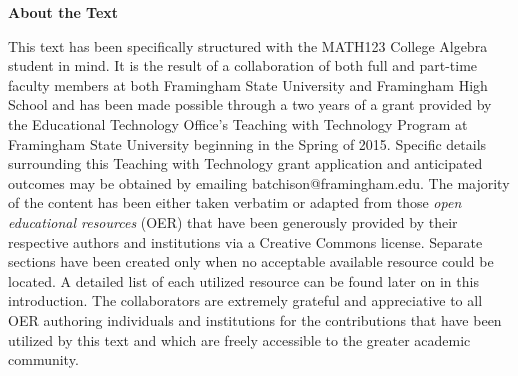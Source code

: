 \begin{center}\textbf{About the Text} \end{center}\par \indent This text has been specifically structured with the MATH123 College Algebra student in mind.  It is the result of a collaboration of both full and part-time faculty members at both Framingham State University and Framingham High School and has been made possible through a two years of a grant provided by the Educational Technology Office's Teaching with Technology Program at Framingham State University beginning in the Spring of 2015.  Specific details surrounding this Teaching with Technology grant application and anticipated outcomes may be obtained by emailing {\small batchison@framingham.edu}.
\pp \indent The majority of the content has been either taken verbatim or adapted from those \textit{open educational resources} (OER) that have been generously provided by their respective authors and institutions via a Creative Commons license.  Separate sections have been created only when no acceptable available resource could be located.  A detailed list of each utilized resource can be found later on in this introduction.  The collaborators are extremely grateful and appreciative to all OER authoring individuals and institutions for the contributions that have been utilized by this text and which are freely accessible to the greater academic community.
\par
{}

